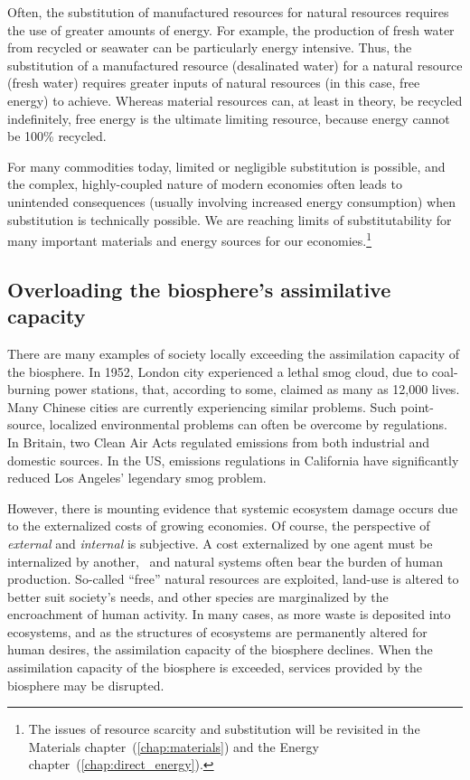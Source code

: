 Often, the substitution of manufactured resources for natural resources
requires the use of greater amounts of energy.
For example, the production of fresh water from recycled or seawater
can be particularly energy intensive.
Thus, the substitution of a manufactured resource (desalinated water)
for a natural resource (fresh water)
requires greater inputs of natural resources (in this case, free energy) to achieve.
Whereas material resources can, at least in theory,
be recycled indefinitely,
free energy is the ultimate limiting resource, 
because energy cannot be 100\% recycled.

For many commodities today, limited or negligible substitution is possible,
and the complex, highly-coupled nature of modern economies
often leads to unintended consequences (usually involving increased energy consumption)
when substitution is technically possible.
We are reaching limits of substitutability for many important 
materials and energy sources for our 
economies.\footnote{The issues of resource scarcity and substitution
	will be revisited in 
	the Materials chapter~(\ref{chap:materials}) and
	the Energy chapter~(\ref{chap:direct_energy}).}


\subsection{Overloading the biosphere's assimilative capacity}

There are many examples of society locally exceeding 
the assimilation capacity of the biosphere.
In 1952, London city experienced a lethal smog cloud,
due to coal-burning power stations,
that, according to some, 
claimed as many as 12,000 lives.\cite{Davis2002,Bell2004}
Many Chinese cities are currently experiencing similar problems.
Such point-source, localized environmental problems can often be overcome
by regulations.
In Britain, two Clean Air Acts regulated emissions from both
industrial and domestic sources.\cite{Brimblecombe2006}	
In the US, emissions regulations in California have 
significantly reduced Los Angeles' legendary smog problem.

However, there is mounting evidence that systemic ecosystem
damage occurs due to the externalized costs
of growing economies.
Of course, the perspective of \emph{external} and \emph{internal} is subjective.
A cost externalized by one agent
must be internalized by another,~\cite{MEA2005,Ewing2008}
and natural systems often bear the burden of human production.
So-called ``free'' natural resources are exploited,
land-use is altered to better suit society's needs,
and other species are marginalized by the encroachment of human activity.\cite{schnaiberg1980}
In many cases, as more waste is deposited into ecosystems,
and as the structures of ecosystems are permanently altered for human desires,
the assimilation capacity of the biosphere declines.
When the assimilation capacity of the biosphere is exceeded, 
services provided by the biosphere may be disrupted.\cite{UNMEA2005}


